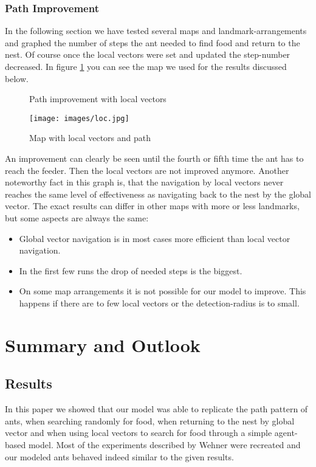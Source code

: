 \documentclass[11pt]{article}
\begin{document}
\subsubsection{Path Improvement}
In the following section we have tested several maps and landmark-arrangements and graphed the number of steps the ant needed to find food and return to the nest. Of course once the local vectors were set and updated the step-number decreased. In figure \ref{maplocal} you can see the map we used for the results discussed below.
\begin{figure}
   \centering
\caption[Path improvement with local vectors]{Path improvement with local vectors}
\label{maplocal}
\end{figure}
\begin{figure}[h!]
   \centering
   \texttt{[image: images/loc.jpg]}
   \caption[Map with local vectors and path]{Map with local vectors and path}
\label{}
\end{figure}
An improvement can clearly be seen until the fourth or fifth time the ant has to reach the feeder. Then the local vectors are not improved anymore. Another noteworthy fact in this graph is, that the navigation by local vectors never reaches the same level of effectiveness as navigating back to the nest by the global vector. The exact results can differ in other maps with more or less landmarks, but some aspects are always the same:
\begin{itemize}
\item Global vector navigation is in most cases more efficient than local vector navigation.
\item In the first few runs the drop of needed steps is the biggest.
\item On some map arrangements it is not possible for our model to improve. This happens if there are to few local vectors or the detection-radius is to small.
\end{itemize}

\newpage
\section{Summary and Outlook}
\subsection{Results}
In this paper we showed that our model was able to replicate the path pattern of ants, when searching randomly for food, when returning to the nest by global vector and when using local vectors to search for food through a simple agent-based model. Most of the experiments described by Wehner\cite{wehner03,wehner98} were recreated and our modeled ants behaved indeed similar to the given results.
\end{document}
